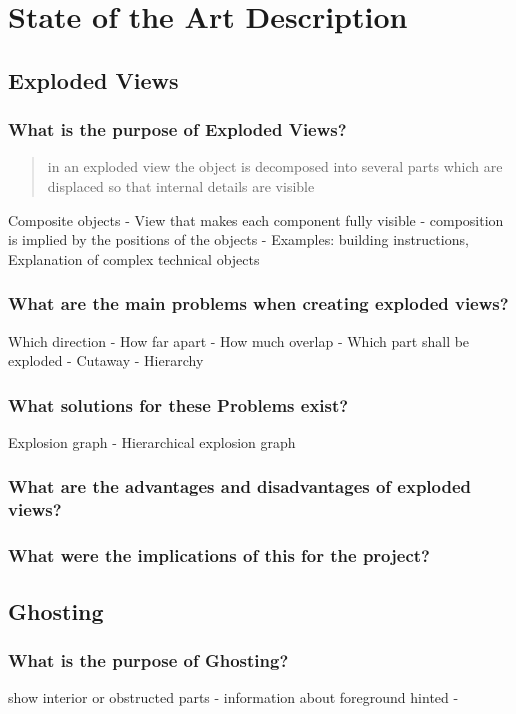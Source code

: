 \chapter{State of the Art Description}
\section{Exploded Views}
\subsection{What is the purpose of Exploded Views?}

\begin{quote}
in an exploded view the object is decomposed into several parts which are displaced so that internal details are visible \cite{BruGr2006}
\end{quote}
Composite objects - View that makes each component fully visible - composition is implied by the positions of the objects - Examples: building instructions, Explanation of complex technical objects
\subsection{What are the main problems when creating exploded views?}
Which direction - How far apart - How much overlap - Which part shall be exploded - Cutaway - Hierarchy
\subsection{What solutions for these Problems exist?}
Explosion graph - Hierarchical explosion graph
\subsection{What are the advantages and disadvantages of exploded views?}

\subsection{What were the implications of this for the project?}

\section{Ghosting}
\subsection{What is the purpose of Ghosting?}
show interior or obstructed parts - information about foreground hinted - 
